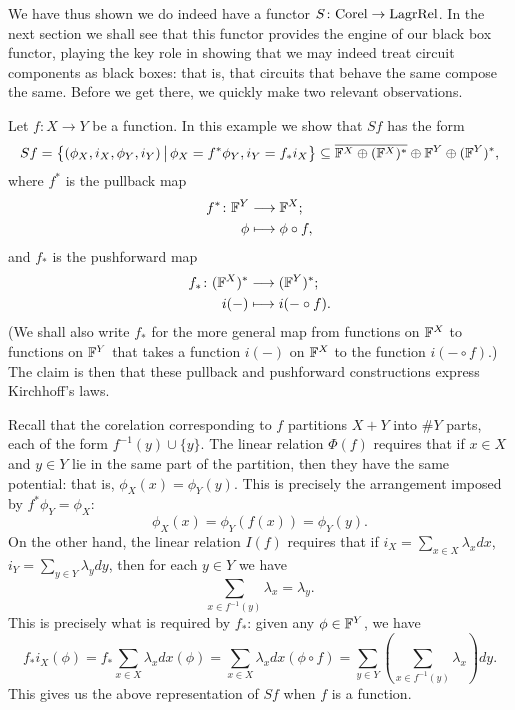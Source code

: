 We have thus shown we do indeed have a functor $S{\colon} \mathrm{Corel} \to
\mathrm{LagrRel}$. In the next section we shall see that this functor provides
the engine of our black box functor, playing the key role in showing that we
may indeed treat circuit components as black boxes: that is, that circuits that
behave the same compose the same. Before we get there, we quickly make two
relevant observations.

\begin{example} \label{ex:sympfunction}
  Let $f: X \to Y$ be a function. In this example we show that $Sf$ has the form 
  \[
    Sf = \big\{(\phi_X,i_X,\phi_Y,i_Y) \, \big\vert \, \phi_X = f^\ast\phi_Y,
    i_Y = f_\ast i_X \big\} \subseteq \overline{{\mathbb F}^X \oplus ({\mathbb F}^X)^\ast} \oplus
    {\mathbb F}^Y \oplus ({\mathbb F}^Y)^\ast,
  \]
  where $f^\ast$ is the pullback map
  \begin{align*}
    f^\ast{\colon} {\mathbb F}^Y &\longrightarrow {\mathbb F}^X; \\
    \phi &\longmapsto \phi \circ f,
  \end{align*}
  and $f_\ast$ is the pushforward map
  \begin{align*}
    f_\ast{\colon} ({\mathbb F}^X)^\ast &\longrightarrow ({\mathbb F}^Y)^\ast; \\
    i(-) &\longmapsto i(-\circ f).
  \end{align*}
  (We shall also write $f_\ast$ for the more general map from functions on
  ${\mathbb F}^X$ to functions on ${\mathbb F}^Y$ that takes a function $i(-)$ on ${\mathbb F}^X$ to the
  function $i(-\circ f)$.) The claim is then that these pullback and pushforward
  constructions express Kirchhoff's laws.

  Recall that the corelation corresponding to $f$ partitions $X+Y$ into $\#Y$
  parts, each of the form $f^{-1}(y) \cup \{y\}$. The linear relation $\Phi(f)$
  requires that if $x \in X$ and $y \in Y$ lie in the same part of the
  partition, then they have the same potential: that is, $\phi_X(x) =
  \phi_Y(y)$. This is precisely the arrangement imposed by $f^\ast \phi_Y =
  \phi_X$: 
  \[
    \phi_X(x) = \phi_Y(f(x)) =\phi_Y(y).
  \] 
  On the other hand, the linear relation $I(f)$ requires that if $i_X = \sum_{x 
  \in X}\lambda_xdx$, $i_Y = \sum_{y \in Y}\lambda_y dy$, then for each $y \in Y$
  we have 
  \[
    \sum_{x \in f^{-1}(y)} \lambda_x = \lambda_y.
  \]
  This is precisely what is required by $f_\ast$: given any $\phi \in {\mathbb F}^Y$, we
  have
  \[
    f_\ast i_X(\phi) = f_\ast \sum_{x \in X}\lambda_xdx(\phi) = \sum_{x
    \in X}\lambda_xdx(\phi \circ f)= \sum_{y \in Y}\left( \sum_{x \in f^{-1}(y)}
    \lambda_x\right)dy.
  \]
  This gives us the above representation of $Sf$ when $f$ is a function.
\end{example}

